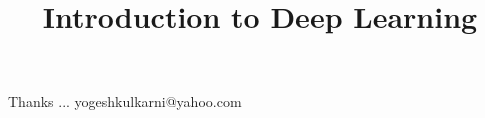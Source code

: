 \documentclass[xcolor=dvipsnames,compress,t,pdf,9pt]{beamer}
\title[\insertframenumber /\inserttotalframenumber]{Introduction to Deep Learning}
\begin{document}
	\begin{frame}
	\titlepage
	\end{frame}

%	
	
	
	\begin{frame}[c]{}
	Thanks ...
	\vspace{5mm}
	yogeshkulkarni@yahoo.com
	\end{frame}
\end{document}
